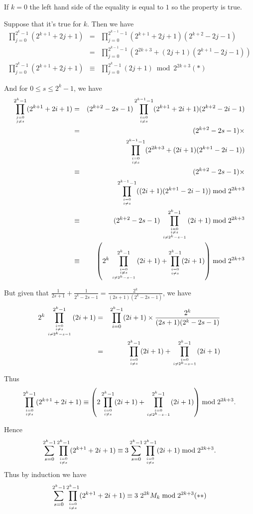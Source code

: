 \documentclass[a4paper,12pt]{article}
\begin{document}
If $k=0$ the left hand side of the equality is equal to $1$ so the
property is true.

Suppose that it's true for $k$.  Then we have
\begin{eqnarray*}
  \prod_{j=0}^{2^k-1}(2^{k+1} + 2j + 1) &=& \prod_{j=0}^{2^{k-1}-1}(2^{k+1}
  + 2j + 1)(2^{k+2} - 2j - 1) \\
  &=& \prod_{j=0}^{2^{k-1}-1}(2^{2k+3} + (2j+1)(2^{k+1}-2j-1)) \\
  \prod_{j=0}^{2^k-1}(2^{k+1} + 2j + 1) &\equiv&
  \prod_{j=0}^{2^k-1}(2j+1) \bmod 2^{2k+3} (*)
\end{eqnarray*}

And for $0 \le s \le 2^k -1$, we have
\begin{eqnarray*}
  \prod_{j=0 \atop j\not= s}^{2^k-1} (2^{k+1} + 2i + 1) &=& (2^{k+2} -
  2s -1) \prod_{i=0 \atop i \not= s}^{2^{k-1}-1}(2^{k+1} + 2i +
  1)(2^{k+2} - 2i - 1) \\
  &=& (2^{k+2} - 2s - 1) \times \\
  &&\prod_{i=0\atop i\not=s}^{2^{k-1}-1}(2^{2k+3}
  + (2i+1)(2^{k+1}-2i-1)) \\
  &\equiv& (2^{k+2} - 2s - 1) \times \\
  &&\prod_{i=0\atop i\not=s}^{2^{k-1}-1}((2i+1)(2^{k+1}-2i-1)) \bmod
  2^{2k+3}\\
  &\equiv& (2^{k+2} - 2s -1) \prod_{i=0\atop {i \not= s \atop i \not=
      2^k - s -1}}^{2^k-1} (2i+1) \bmod 2^{2k+3} \\
  &\equiv& \left(2^k\prod_{i=0\atop {i \not= s \atop i \not=
      2^k - s -1}}^{2^k-1} (2i+1) + \prod_{i=0\atop i\not=
    s}^{2^k-1}(2i+1)\right) \bmod 2^{2k+3}
\end{eqnarray*}

But given that $\frac{1}{2s+1} + \frac{1}{2^k - 2s - 1} =
\frac{2^k}{(2s+1)(2^k-2s-1)}$, we have
\begin{eqnarray*}
2^k\prod_{i=0\atop {i \not= s \atop i \not=
      2^k - s -1}}^{2^k-1} (2i+1) &=& \prod_{i=0}^{2^k-1}(2i+1)\times
\frac{2^k}{(2s+1)(2^k-2s-1)} \\
&=& \prod_{i=0\atop i\not= s}^{2^k-1}(2i+1) + \prod_{i=0\atop i\not= 2^k-s-1}^{2^k-1}(2i+1)
\end{eqnarray*}

Thus
\[  \prod_{i=0\atop i\not= s}^{2^k - 1}(2^{k+1} + 2i + 1) \equiv \left(2
\prod_{i=0\atop i\not= s}^{2^k-1}(2i+1) + \prod_{i=0\atop i\not= 2^k
  -s -1}^{2^k-1}(2i+1)\right) \bmod 2^{2k+3}.\]

Hence
\[\sum_{s=0}^{2^k-1}\prod_{i=0\atop i\not=s}^{2^k-1}(2^{k+1} + 2i +
1) \equiv 3 \sum_{s=0}^{2^k-1}\prod_{i=0\atop i\not=s}^{2^k-1}(2i+1)
\bmod 2^{2k+3}.\]
Thus by induction we have
\[\sum_{s=0}^{2^k-1}\prod_{i=0\atop i\not=s}^{2^k-1}(2^{k+1} + 2i +
1) \equiv 3\ 2^{2k}M_k \bmod 2^{2k+3} (**) \]
\end{document}
